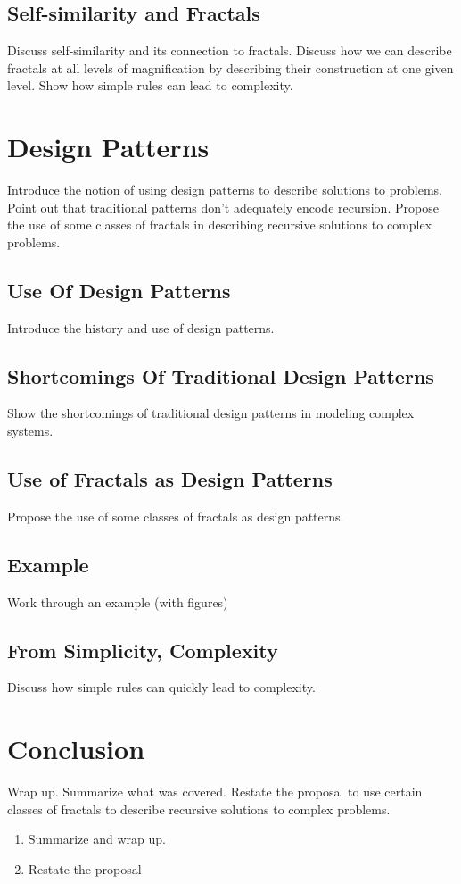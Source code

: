 \documentclass[jou,apacite]{apa6}
\begin{document}
\subsection{Self-similarity and Fractals}
Discuss self-similarity and its connection to fractals.  Discuss how we can describe fractals at all levels of magnification by describing their construction at one given level.  Show how simple rules can lead to complexity.

\section{Design Patterns}  %
Introduce the notion of using design patterns to describe solutions to problems.  Point out that traditional patterns don't adequately encode recursion.  Propose the use of some classes of fractals in describing recursive solutions to complex problems.
\subsection{Use Of Design Patterns}
Introduce the history and use of design patterns.

\subsection{Shortcomings Of Traditional Design Patterns}
Show the shortcomings of traditional design patterns in modeling complex systems.

\subsection{Use of Fractals as Design Patterns}
Propose the use of some classes of fractals as design patterns.

\subsection{Example}
Work through an example (with figures)

\subsection{From Simplicity, Complexity}
Discuss how simple rules can quickly lead to complexity.

\section{Conclusion}  %
Wrap up.  Summarize what was covered.  Restate the proposal to use certain classes of fractals to describe recursive solutions to complex problems.
\begin{enumerate}
  \item Summarize and wrap up.
  \item Restate the proposal
\end{enumerate}


\end{document}
